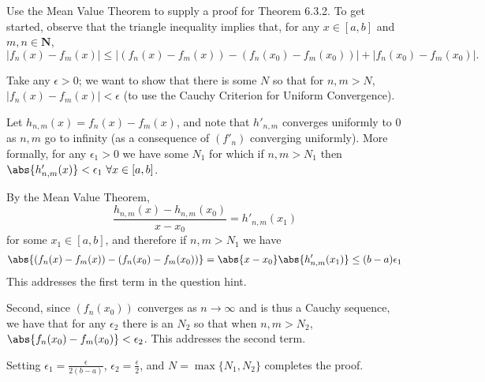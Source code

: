 \begin{exercise}
  Use the Mean Value Theorem to supply a proof for Theorem 6.3.2. To get started, observe that the triangle inequality implies that, for any $x \in[a, b]$ and $m, n \in \mathbf{N}$,
  $$
  \left|f_{n}(x)-f_{m}(x)\right| \leq\left|\left(f_{n}(x)-f_{m}(x)\right)-\left(f_{n}\left(x_{0}\right)-f_{m}\left(x_{0}\right)\right)\right|+\left|f_{n}\left(x_{0}\right)-f_{m}\left(x_{0}\right)\right| .
  $$
\end{exercise}
\begin{solution}
Take any \(\epsilon > 0\); we want to show that there is some \(N\) so that for \(n, m > N\), \(|f_n(x) - f_m(x)| < \epsilon\) (to use the Cauchy Criterion for Uniform Convergence).

Let \(h_{n,m}(x) = f_n(x) - f_m(x)\), and note that \(h'_{n,m}\) converges uniformly to 0 as \(n,m\) go to infinity (as a consequence of \((f'_n)\) converging uniformly). More formally, for any \(\epsilon_1 > 0\) we have some \(N_1\) for which if \(n,m > N_1\) then \(\abs{h'_{n,m}(x)} < \epsilon_1\  \forall x \in [a,b]\).

By the Mean Value Theorem,
\[\frac{h_{n,m}(x) - h_{n,m}(x_0)}{x-x_0} = h'_{n,m}(x_1)\]
for some \(x_1 \in [a,b]\), and therefore if \(n,m > N_1\) we have
\[\abs{(f_n(x) - f_m(x)) - (f_n(x_0) - f_m(x_0))} = \abs{x - x_0}\abs{h'_{n,m}(x_1)} \leq (b-a)\epsilon_1\]
This addresses the first term in the question hint.

Second, since \((f_n(x_0))\) converges as \(n \to \infty\) and is thus a Cauchy sequence, we have that for any \(\epsilon_2\) there is an \(N_2\) so that when \(n,m > N_2\), \(\abs{f_n(x_0) - f_m(x_0)} < \epsilon_2\). This addresses the second term.

Setting \(\epsilon_1 = \frac{\epsilon}{2(b-a)}\), \(\epsilon_2 = \frac{\epsilon}{2}\), and \(N = \max\{N_1, N_2\}\) completes the proof.
\end{solution}

